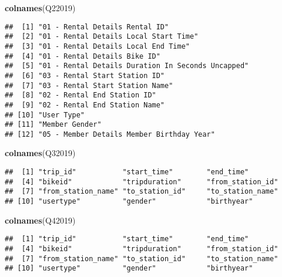 \documentclass[
]{article}
\newenvironment{Shaded}{\begin{snugshade}}{\end{snugshade}}
\newcommand{\FunctionTok}[1]{\textcolor[rgb]{0.13,0.29,0.53}{\textbf{#1}}}
\newcommand{\NormalTok}[1]{#1}
\begin{document}
\begin{Shaded}
\begin{Highlighting}[]
\FunctionTok{colnames}\NormalTok{(Q22019)}
\end{Highlighting}
\end{Shaded}

\begin{verbatim}
##  [1] "01 - Rental Details Rental ID"                   
##  [2] "01 - Rental Details Local Start Time"            
##  [3] "01 - Rental Details Local End Time"              
##  [4] "01 - Rental Details Bike ID"                     
##  [5] "01 - Rental Details Duration In Seconds Uncapped"
##  [6] "03 - Rental Start Station ID"                    
##  [7] "03 - Rental Start Station Name"                  
##  [8] "02 - Rental End Station ID"                      
##  [9] "02 - Rental End Station Name"                    
## [10] "User Type"                                       
## [11] "Member Gender"                                   
## [12] "05 - Member Details Member Birthday Year"
\end{verbatim}

\begin{Shaded}
\begin{Highlighting}[]
\FunctionTok{colnames}\NormalTok{(Q32019)}
\end{Highlighting}
\end{Shaded}

\begin{verbatim}
##  [1] "trip_id"           "start_time"        "end_time"         
##  [4] "bikeid"            "tripduration"      "from_station_id"  
##  [7] "from_station_name" "to_station_id"     "to_station_name"  
## [10] "usertype"          "gender"            "birthyear"
\end{verbatim}

\begin{Shaded}
\begin{Highlighting}[]
\FunctionTok{colnames}\NormalTok{(Q42019)}
\end{Highlighting}
\end{Shaded}

\begin{verbatim}
##  [1] "trip_id"           "start_time"        "end_time"         
##  [4] "bikeid"            "tripduration"      "from_station_id"  
##  [7] "from_station_name" "to_station_id"     "to_station_name"  
## [10] "usertype"          "gender"            "birthyear"
\end{verbatim}
\end{document}
